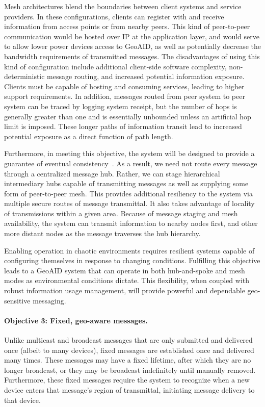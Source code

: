 \documentclass{sbir}
\begin{document}
Mesh architectures blend the boundaries between client systems and service providers. In these configurations, clients can register with and receive information from access points or from nearby peers. This kind of peer-to-peer communication would be hosted over IP at the application layer, and would serve to allow lower power devices access to GeoAID, as well as potentially decrease the bandwidth requirements of transmitted messages. The disadvantages of using this kind of configuration include additional client-side software complexity, non-deterministic message routing, and increased potential information exposure. Clients must be capable of hosting and consuming services, leading to higher support requirements. In addition, messages routed from peer system to peer system can be traced by logging system receipt, but the number of hops is generally greater than one and is essentially unbounded unless an artificial hop limit is imposed. These longer paths of information transit lead to increased potential exposure as a direct function of path length.

Furthermore, in meeting this objective, the system will be designed to provide a guarantee of eventual consistency~\cite{LiPoClGePrNuRo:12}. As a result, we need not route every message through a centralized message hub. Rather, we can stage hierarchical intermediary hubs capable of transmitting messages as well as supplying some form of peer-to-peer mesh. This provides additional resiliency to the system via multiple secure routes of message transmittal. It also takes advantage of locality of transmissions within a given area. Because of message staging and mesh availability, the system can transmit information to nearby nodes first, and other more distant nodes as the message traverses the hub hierarchy.

Enabling operation in chaotic environments requires resilient systems capable of configuring themselves in response to changing conditions. Fulfilling this objective leads to a GeoAID system that can operate in both hub-and-spoke and mesh modes as environmental conditions dictate. This flexibility, when coupled with robust information usage management, will provide powerful and dependable geo-sensitive messaging.

\paragraph{Objective 3: Fixed, geo-aware messages.} Unlike multicast and broadcast messages that are only submitted and delivered once (albeit to many devices), fixed messages are established once and delivered many times. These messages may have a fixed lifetime, after which they are no longer broadcast, or they may be broadcast indefinitely until manually removed. Furthermore, these fixed messages require the system to recognize when a new device enters that message's region of transmittal, initiating message delivery to that device.
\end{document}
